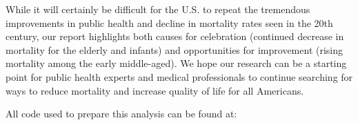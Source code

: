 \documentclass[11pt]{article}
\begin{document}
While it will certainly be difficult for the U.S. to repeat the tremendous improvements in public health and decline in mortality rates seen in the 20th century, our report highlights both causes for celebration (continued decrease in mortality for the elderly and infants) and opportunities for improvement (rising mortality among the early middle-aged).
We hope our research can be a starting point for public health experts and medical professionals to continue searching for ways to reduce mortality and increase quality of life for all Americans.

All code used to prepare this analysis can be found at: 

\newpage

{}
\end{document}
